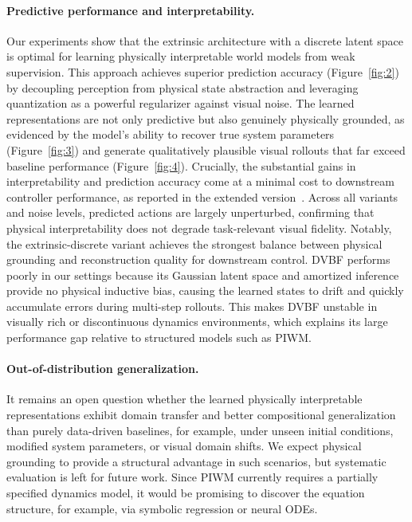 \documentclass[nonacm,sigconf]{acmart}
\begin{document}
\paragraph{Predictive performance and interpretability.}
Our experiments show that the extrinsic architecture with a discrete latent space is optimal for learning physically interpretable world models from weak supervision. This approach achieves superior prediction accuracy (Figure~\ref{fig:2}) by decoupling perception from physical state abstraction and leveraging quantization as a powerful regularizer against visual noise. The learned representations are not only predictive but also genuinely physically grounded, as evidenced by the model's ability to recover true system parameters (Figure~\ref{fig:3}) and generate qualitatively plausible visual rollouts that far exceed baseline performance (Figure~\ref{fig:4}). Crucially, the substantial gains in interpretability and prediction accuracy come at a minimal cost to downstream controller performance, as reported in the extended version~\cite{extended}. Across all variants and noise levels, predicted actions are largely unperturbed, confirming that physical interpretability does not degrade task-relevant visual fidelity. Notably, the extrinsic-discrete variant achieves the strongest balance between physical grounding and reconstruction quality for downstream control. DVBF performs poorly in our settings because its Gaussian latent space and amortized inference provide no physical inductive bias, causing the learned states to drift and quickly accumulate errors during multi-step rollouts. This makes DVBF unstable in visually rich or discontinuous dynamics environments, which explains its large performance gap relative to structured models such as PIWM.

\paragraph{Out-of-distribution generalization.}
It remains an open question whether the learned physically interpretable representations exhibit domain transfer and better compositional generalization than purely data-driven baselines, for example, under unseen initial conditions, modified system parameters, or visual domain shifts. We expect physical grounding to provide a structural advantage in such scenarios, but systematic evaluation is left for future work. Since PIWM currently requires a partially specified dynamics model, it would be promising to discover the equation structure, for example, via symbolic regression or neural ODEs.
\end{document}
